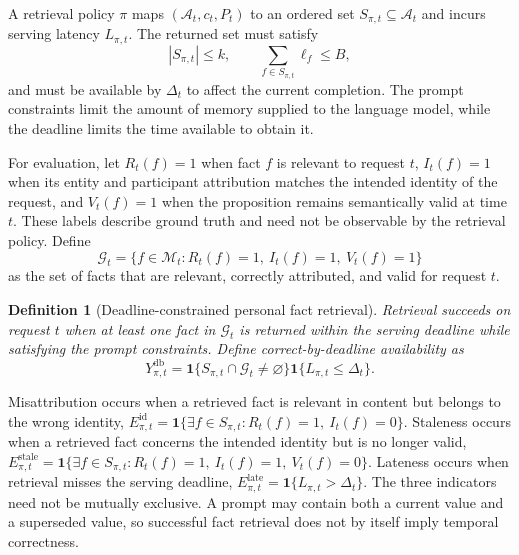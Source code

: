 \documentclass[letterpaper]{article} %
\newtheorem{definition}{Definition}
\begin{document}
A retrieval policy $\pi$ maps $(\mathcal{A}_t,c_t,P_t)$ to an ordered set $S_{\pi,t}\subseteq\mathcal{A}_t$ and incurs serving latency $L_{\pi,t}$. The returned set must satisfy
\begin{equation}
|S_{\pi,t}|\le k, \qquad \sum_{f\in S_{\pi,t}}\ell_f\le B,
\end{equation}
and must be available by $\Delta_t$ to affect the current completion. The prompt constraints limit the amount of memory supplied to the language model, while the deadline limits the time available to obtain it.

For evaluation, let $R_t(f)=1$ when fact $f$ is relevant to request $t$, $I_t(f)=1$ when its entity and participant attribution matches the intended identity of the request, and $V_t(f)=1$ when the proposition remains semantically valid at time $t$. These labels describe ground truth and need not be observable by the retrieval policy. Define
\begin{equation}
\mathcal{G}_t=\{f\in\mathcal{M}_t:R_t(f)=1,\ I_t(f)=1,\ V_t(f)=1\}
\end{equation}
as the set of facts that are relevant, correctly attributed, and valid for request $t$.

\begin{definition}[Deadline-constrained personal fact retrieval]
Retrieval succeeds on request $t$ when at least one fact in $\mathcal{G}_t$ is returned within the serving deadline while satisfying the prompt constraints. Define correct-by-deadline availability as
\begin{equation}
Y^{\mathrm{db}}_{\pi,t}=\mathbf{1}\{S_{\pi,t}\cap\mathcal{G}_t\neq\varnothing\}\mathbf{1}\{L_{\pi,t}\le\Delta_t\}.
\end{equation}
\end{definition}

Misattribution occurs when a retrieved fact is relevant in content but belongs to the wrong identity, $E^{\mathrm{id}}_{\pi,t}=\mathbf{1}\{\exists f\in S_{\pi,t}:R_t(f)=1,\ I_t(f)=0\}$. Staleness occurs when a retrieved fact concerns the intended identity but is no longer valid, $E^{\mathrm{stale}}_{\pi,t}=\mathbf{1}\{\exists f\in S_{\pi,t}:R_t(f)=1,\ I_t(f)=1,\ V_t(f)=0\}$. Lateness occurs when retrieval misses the serving deadline, $E^{\mathrm{late}}_{\pi,t}=\mathbf{1}\{L_{\pi,t}>\Delta_t\}$. The three indicators need not be mutually exclusive. A prompt may contain both a current value and a superseded value, so successful fact retrieval does not by itself imply temporal correctness.
\end{document}
